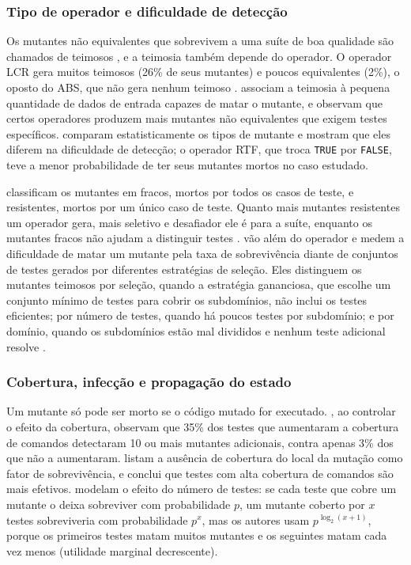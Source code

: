\subsubsection{Tipo de operador e dificuldade de detecção}
\label{subsubsec:tipo-operador}

Os mutantes não equivalentes que sobrevivem a uma suíte de boa qualidade são chamados de teimosos \cite{yao2014}, e a teimosia também depende do operador. O operador LCR gera muitos teimosos (26\% de seus mutantes) e poucos equivalentes (2\%), o oposto do ABS, que não gera nenhum teimoso \cite{yao2014}.  associam a teimosia à pequena quantidade de dados de entrada capazes de matar o mutante, e  observam que certos operadores produzem mais mutantes não equivalentes que exigem testes específicos.  comparam estatisticamente os tipos de mutante e mostram que eles diferem na dificuldade de detecção; o operador RTF, que troca \texttt{TRUE} por \texttt{FALSE}, teve a menor probabilidade de ter seus mutantes mortos no caso estudado.

 classificam os mutantes em fracos, mortos por todos os casos de teste, e resistentes, mortos por um único caso de teste. Quanto mais mutantes resistentes um operador gera, mais seletivo e desafiador ele é para a suíte, enquanto os mutantes fracos não ajudam a distinguir testes \cite{esterobotaro2010}.  vão além do operador e medem a dificuldade de matar um mutante pela taxa de sobrevivência diante de conjuntos de testes gerados por diferentes estratégias de seleção. Eles distinguem os mutantes teimosos por seleção, quando a estratégia gananciosa, que escolhe um conjunto mínimo de testes para cobrir os subdomínios, não inclui os testes eficientes; por número de testes, quando há poucos testes por subdomínio; e por domínio, quando os subdomínios estão mal divididos e nenhum teste adicional resolve \cite{lin2018}.

\subsubsection{Cobertura, infecção e propagação do estado}
\label{subsubsec:cobertura-infeccao}

Um mutante só pode ser morto se o código mutado for executado. , ao controlar o efeito da cobertura, observam que 35\% dos testes que aumentaram a cobertura de comandos detectaram 10 ou mais mutantes adicionais, contra apenas 3\% dos que não a aumentaram.  listam a ausência de cobertura do local da mutação como fator de sobrevivência, e  conclui que testes com alta cobertura de comandos são mais efetivos.  modelam o efeito do número de testes: se cada teste que cobre um mutante o deixa sobreviver com probabilidade $p$, um mutante coberto por $x$ testes sobreviveria com probabilidade $p^x$, mas os autores usam $p^{\log_2(x + 1)}$, porque os primeiros testes matam muitos mutantes e os seguintes matam cada vez menos (utilidade marginal decrescente).

